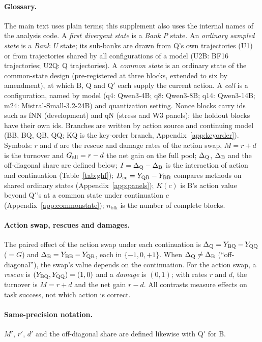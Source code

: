 \paragraph{Glossary.} The main text uses plain terms; this supplement also uses the internal names of the analysis code. A \emph{first divergent state} is a \emph{Bank P} state. An \emph{ordinary sampled state} is a \emph{Bank U} state; its sub-banks are drawn from Q's own trajectories (U1) or from trajectories shared by all configurations of a model (U2B: BF16 trajectories; U2Q: Q trajectories). A \emph{common state} is an ordinary state of the common-state design (pre-registered at three blocks, extended to six by amendment), at which B, Q and Q$'$ each supply the current action. A \emph{cell} is a configuration, named by model (q4: Qwen3-4B; q8: Qwen3-8B; q14: Qwen3-14B; m24: Mistral-Small-3.2-24B) and quantization setting. %
Nonce blocks carry ids such as fNN (development) and qN (stress and W3 panels); the holdout blocks have their own ids. Branches are written by action source and continuing model (BB, BQ, QB, QQ; KQ is the key-order branch, Appendix~\ref{app:keyorder}). Symbols: $r$ and $d$ are the rescue and damage rates of the action swap, $M=r+d$ is the turnover and $G_{\mathrm{all}}=r-d$ the net gain on the full pool; $\Delta_{\mathrm{Q}}$, $\Delta_{\mathrm{B}}$ and the off-diagonal share are defined below; $I=\Delta_{\mathrm{Q}}-\Delta_{\mathrm{B}}$ is the interaction of action and continuation (Table~\ref{tab:ghf}); $D_{cc}=Y_{\mathrm{QB}}-Y_{\mathrm{BB}}$ compares methods on shared ordinary states (Appendix~\ref{app:panels}); $K(c)$ is B's action value beyond Q$'$'s at a common state under continuation $c$ (Appendix~\ref{app:commonstate}); $n_{\mathrm{blk}}$ is the number of complete blocks.

\paragraph{Action swap, rescues and damages.} The paired effect of the action swap under each continuation is $\Delta_{\mathrm{Q}}=Y_{\mathrm{BQ}}-Y_{\mathrm{QQ}}$ ($=G$) and $\Delta_{\mathrm{B}}=Y_{\mathrm{BB}}-Y_{\mathrm{QB}}$, each in $\{-1,0,+1\}$. When $\Delta_{\mathrm{Q}}\neq\Delta_{\mathrm{B}}$ (``off-diagonal''), the swap's value depends on the continuation. For the action swap, a \emph{rescue} is $(Y_{\mathrm{BQ}},Y_{\mathrm{QQ}})=(1,0)$ and a \emph{damage} is $(0,1)$; with rates $r$ and $d$, the turnover is $M=r+d$ and the net gain $r-d$. All contrasts measure effects on task success, not which action is correct. %

\paragraph{Same-precision notation.} $M'$, $r'$, $d'$ and the off-diagonal share are defined likewise with Q$'$ for B.


